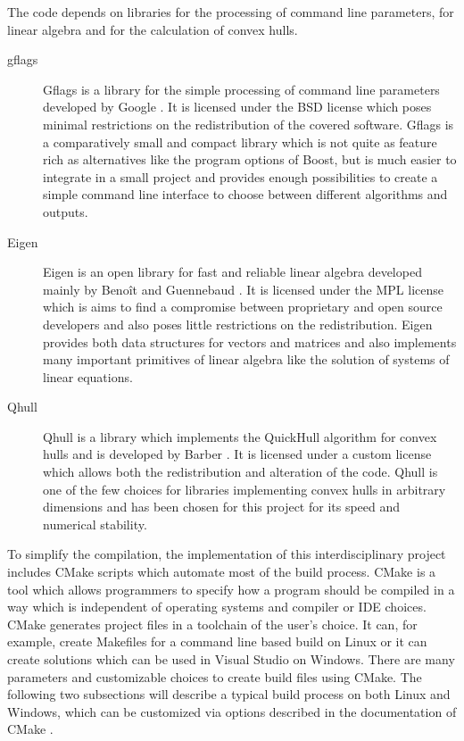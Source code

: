 The code depends on libraries for the processing of command line parameters, for linear algebra and for the calculation of convex hulls.
\begin{description}
    \item[gflags]
        Gflags is a library for the simple processing of command line parameters developed by Google \cite{gflags}.
        It is licensed under the BSD license which poses minimal restrictions on the redistribution of the covered software.
        Gflags is a comparatively small and compact library which is not quite as feature rich as alternatives like the program options of Boost, but is much easier to integrate in a small project and provides enough possibilities to create a simple command line interface to choose between different algorithms and outputs.
    \item[Eigen] Eigen is an open library for fast and reliable linear algebra developed mainly by Benoît and Guennebaud \cite{eigen}.
        It is licensed under the MPL license which is aims to find a compromise between proprietary and open source developers and also poses little restrictions on the redistribution.
        Eigen provides both data structures for vectors and matrices and also implements many important primitives of linear algebra like the solution of systems of linear equations.
    \item[Qhull] Qhull is a library which implements the QuickHull algorithm for convex hulls and is developed by Barber \cite{barber1996quickhull}.
        It is licensed under a custom license which allows both the redistribution and alteration of the code.
        Qhull is one of the few choices for libraries implementing convex hulls in arbitrary dimensions and has been chosen for this project for its speed and numerical stability.
\end{description}

To simplify the compilation, the implementation of this interdisciplinary project includes CMake scripts which automate most of the build process.
CMake \cite{cmake} is a tool which allows programmers to specify how a program should be compiled in a way which is independent of operating systems and compiler or IDE choices.
CMake generates project files in a toolchain of the user's choice.
It can, for example, create Makefiles for a command line based build on Linux or it can create solutions which can be used in Visual Studio on Windows.
There are many parameters and customizable choices to create build files using CMake.
The following two subsections will describe a typical build process on both Linux and Windows, which can be customized via options described in the documentation of CMake \cite{cmake-tutorial}.

